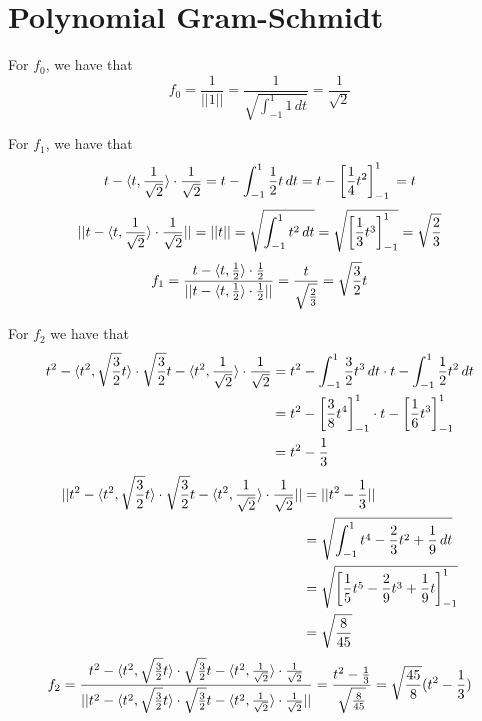 \newcommand{\integral}[1]{\int_{-1}^{1} #1 \,dt}
\newcommand{\brackets}[1]{\left[ #1 \right]_{-1}^{1}}
\section{Polynomial Gram-Schmidt}

For $f_0$, we have that
\[
    f_0 
    = \frac{1}{||1||}
    = \frac{1}{\sqrt{\integral{1}}} 
    = \frac{1}{\sqrt{2}}
\]

For $f_1$, we have that
\[
    t - \inner{t}{\frac{1}{\sqrt{2}}} \cdot \frac{1}{\sqrt{2}}
    = t - \integral{\frac{1}{2} t}  \\
    = t - \brackets{\frac{1}{4} t^2}\\
    = t
\]
\[
    ||t - \inner{t}{\frac{1}{\sqrt{2}}} \cdot \frac{1}{\sqrt{2}}||
    = ||t||\\
    = \sqrt{\integral{t^2}}\\
    = \sqrt{\brackets{\frac{1}{3} t^3}}\\
    = \sqrt{\frac{2}{3}}
\]
\[
    f_1
    = \frac{t - \langle t, \frac{1}{2} \rangle \cdot \frac{1}{2}}{||t - \langle t, \frac{1}{2} \rangle \cdot \frac{1}{2}||}
    = \frac{t}{\sqrt{\frac{2}{3}}}
    = \sqrt{\frac{3}{2}}t
\]

For $f_2$ we have that
\begin{align*}
    t^2 - \inner{t^2}{\sqrt{\frac{3}{2}}t} \cdot \sqrt{\frac{3}{2}}t - \inner{t^2}{\frac{1}{\sqrt{2}}} \cdot \frac{1}{\sqrt{2}}
    &= t^2 - \integral{\frac{3}{2}t^3} \cdot t - \integral{\frac{1}{2}t^2}\\
    &= t^2 - \brackets{\frac{3}{8}t^4} \cdot t - \brackets{\frac{1}{6}t^3}\\
    &= t^2 - \frac{1}{3}
\end{align*}
\begin{align*}
    ||t^2 - \inner{t^2}{\sqrt{\frac{3}{2}}t} \cdot \sqrt{\frac{3}{2}}t - \inner{t^2}{\frac{1}{\sqrt{2}}} \cdot \frac{1}{\sqrt{2}}||
    &= ||t^2 - \frac{1}{3}||\\
    &= \sqrt{\integral{t^4 - \frac{2}{3}t^2 + \frac{1}{9}}}\\
    &= \sqrt{\brackets{\frac{1}{5}t^5 - \frac{2}{9}t^3 + \frac{1}{9}t}}\\
    &= \sqrt{\frac{8}{45}}
\end{align*}
\[
    f_2 
    = \frac{t^2 - \langle t^2, \sqrt{\frac{3}{2}}t \rangle \cdot \sqrt{\frac{3}{2}}t - \langle t^2, \frac{1}{\sqrt{2}} \rangle \cdot \frac{1}{\sqrt{2}}}{||t^2 - \langle t^2, \sqrt{\frac{3}{2}}t \rangle \cdot \sqrt{\frac{3}{2}}t - \langle t^2, \frac{1}{\sqrt{2}} \rangle \cdot \frac{1}{\sqrt{2}}||}
    = \frac{t^2 - \frac{1}{3}}{\sqrt{\frac{8}{45}}}
    = \sqrt{\frac{45}{8}}(t^2 - \frac{1}{3})
\]

